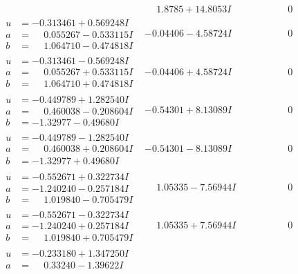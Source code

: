 \documentclass[1p]{elsarticle_modified}
\theoremstyle{definition}
\begin{document}
$$\begin{array}{c|c|c}
 & \phantom{-}1.8785 + 14.8053 I & \phantom{-0.000000 } 0 \\ \hline\begin{aligned}
u &= -0.313461 + 0.569248 I \\
a &= \phantom{-}0.055267 - 0.533115 I \\
b &= \phantom{-}1.064710 - 0.474818 I\end{aligned}
 & -0.04406 - 4.58724 I & \phantom{-0.000000 } 0 \\ \hline\begin{aligned}
u &= -0.313461 - 0.569248 I \\
a &= \phantom{-}0.055267 + 0.533115 I \\
b &= \phantom{-}1.064710 + 0.474818 I\end{aligned}
 & -0.04406 + 4.58724 I & \phantom{-0.000000 } 0 \\ \hline\begin{aligned}
u &= -0.449789 + 1.282540 I \\
a &= \phantom{-}0.460038 - 0.208604 I \\
b &= -1.32977 - 0.49680 I\end{aligned}
 & -0.54301 + 8.13089 I & \phantom{-0.000000 } 0 \\ \hline\begin{aligned}
u &= -0.449789 - 1.282540 I \\
a &= \phantom{-}0.460038 + 0.208604 I \\
b &= -1.32977 + 0.49680 I\end{aligned}
 & -0.54301 - 8.13089 I & \phantom{-0.000000 } 0 \\ \hline\begin{aligned}
u &= -0.552671 + 0.322734 I \\
a &= -1.240240 - 0.257184 I \\
b &= \phantom{-}1.019840 - 0.705479 I\end{aligned}
 & \phantom{-}1.05335 - 7.56944 I & \phantom{-0.000000 } 0 \\ \hline\begin{aligned}
u &= -0.552671 - 0.322734 I \\
a &= -1.240240 + 0.257184 I \\
b &= \phantom{-}1.019840 + 0.705479 I\end{aligned}
 & \phantom{-}1.05335 + 7.56944 I & \phantom{-0.000000 } 0 \\ \hline\begin{aligned}
u &= -0.233180 + 1.347250 I \\
a &= \phantom{-}0.33240 - 1.39622 I \\

\end{aligned}
\end{array}$$
\end{document}
